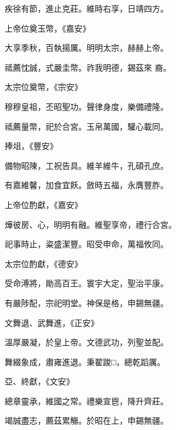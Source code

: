 \begin{pinyinscope}
 疾徐有節，進止克莊。維時右享，日靖四方。



 上帝位奠玉幣，《嘉安》



 大享季秋，百執揚厲。明明太宗，赫赫上帝。



 祗薦忱誠，式嚴圭幣。祚我明德，錫茲來
 裔。



 太宗位奠幣，《宗安》



 穆穆皇祖，丕昭聖功。聲律身度，樂備禮隆。



 祗薦量幣，祀於合宮。玉帛萬國，驩心載同。



 捧俎，《豐安》



 備物昭陳，工祝告具。維羊維牛，孔碩孔庶。



 有嘉維馨，加食宜飫。斂時五福，永膺豐胙。



 上帝位酌獻，《嘉安》



 燁彼房、心，明明有融。維聖享帝，禮行合宮。



 祀事時止，粢盛潔豐。昭受申命，萬福攸同。



 太宗位酌獻，《德安》



 受命溥將，勛高百王。寰宇大定，聖治平康。



 有嚴陟配，宗祀明堂。神保是格，申錫無疆。



 文舞退、武舞進，《正安》



 溫厚嚴凝，於皇上帝。文德武功，列聖並配。



 舞綴象成，肅雍進退。秉翟踆□，總乾蹈厲。



 亞、終獻，《文安》



 總章靈承，維國之常。禮樂宣鬯，降升齊莊。



 竭誠盡志，薦茲累觴。於昭在上，申錫無疆。




\end{pinyinscope}

